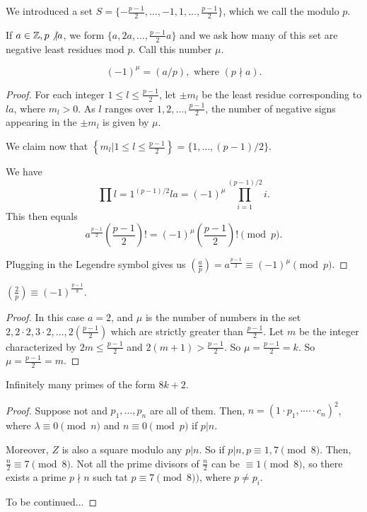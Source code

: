\documentclass{article}
\begin{document}
We introduced a set $S = \{-\frac{p-1}{2}, \ldots, -1, 1, \ldots, \frac{p-1}{2}\}$, which we call the  modulo $p$.

If $a\in\mathbb Z, p \not \vert a$, we form $\{a, 2a, \ldots, \frac{p-1}{2} a\}$ and we ask how many of this set are negative least residues mod $p$. Call this number $\mu$.

\begin{lemma} 
	\[(-1)^\mu = (a / p), \text{ where } (p \nmid a).\]
\end{lemma}

\begin{proof}
	For each integer $1 \leq l \leq \frac{p-1}{2}$, let $\pm m_l$ be the least residue corresponding to $la$, where $m_l > 0$. As $l$ ranges over $1, 2, \ldots, \frac{p-1}{2}$, the number of negative signs appearing in the $\pm m_l$ is given by $\mu$.

	We claim now that $\left\{m_l | 1 \leq l \leq \frac{p-1}{2}\right\} = \{1, \ldots, (p-1)/2\}$. 

	We have \[\prod{l = 1}^{(p-1)/2} la = (-1)^\mu \prod_{i = 1}^{(p-1)/2} i.\] 
	This then equals \[a^{\frac{p-1}{2}} \left(\frac{p-1}{2}\right)! = (-1)^\mu \left(\frac{p-1}{2}\right)! \pmod p.\] 

	Plugging in the Legendre symbol gives us $\left(\frac{a}{p}\right) = a^{\frac{p-1}{2}} \equiv (-1)^\mu \pmod p$.
\end{proof}

\begin{proposition}
	$\left(\frac{2}{p}\right) \equiv (-1)^{\frac{p-1}{8}}$. 
\end{proposition}

\begin{proof}
	In this case $a = 2$, and $\mu$ is the number of numbers in the set $2, 2 \cdot 2, 3 \cdot 2, \ldots, 2\left(\frac{p-1}{2}\right)$
	which are strictly greater than $\frac{p-1}{2}$. Let $m$ be the integer characterized by 
	$2m \leq \frac{p-1}{2}$ and $2(m + 1) > \frac{p-1}{2}$. So $\mu = \frac{p-1}{2}= k$. So $\mu = \frac{p-1}{2} = m$.
\end{proof}

\begin{corollary}
	Infinitely many primes of the form $8k + 2$.
\end{corollary}

\begin{proof}
	Suppose not and $p_1, \ldots, p_n$ are all of them. Then, $n = (1 \cdot p_1, \cdot \cdots \cdot c_n)^2$, where $\lambda \equiv 0 \pmod n$ and $ n \equiv 0 \pmod p$ if $p | n$.

	Moreover, $Z$ is also a square modulo any $p | n$. So if $p | n, p \equiv 1, 7 \pmod 8$. Then, $\frac{n}{2} \equiv 7 \pmod 8$. Not all the prime divisors of $\frac{n}{2}$ can be $\equiv 1 \pmod 8$, so there exists a prime $p \nmid n$ such tat $p \equiv 7 \pmod 8)$, where $p \neq p_i$. 

	To be continued...
\end{proof}
\end{document}
